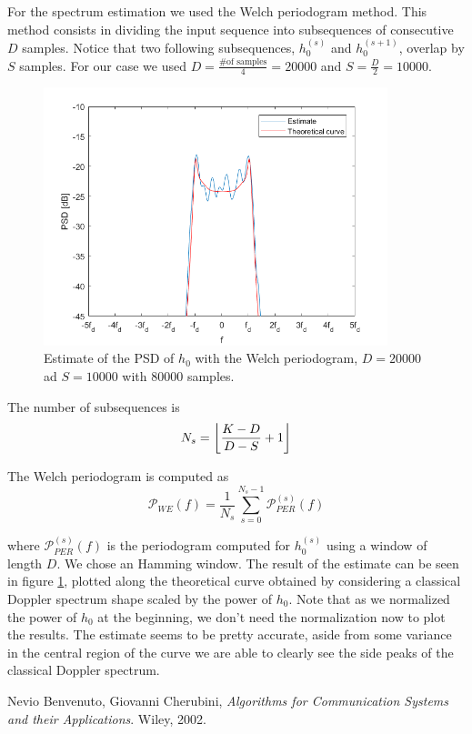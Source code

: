 \documentclass[a4paper,11.5pt]{article}
\DeclarePairedDelimiter{\floor}{\lfloor}{\rfloor}
\begin{document}
For the spectrum estimation we used the Welch periodogram method. This method consists in dividing the input sequence into subsequences of consecutive $D$ samples. Notice that two following subsequences, $h_0^{(s)}$ and $h_0^{(s+1)}$, overlap by $S$ samples. For our case we used $D =\frac{ \mbox{\# of samples}}{ 4}=20000$ and $S = \frac{D}{2}=10000$. \\


\begin{figure}[ht]
	\begin{center}    
		\includegraphics[width=10cm]{figs/PSD-est.png}
		\caption{Estimate of the PSD of $h_0$ with the Welch periodogram, $D=20000$ ad $S=10000$ with $80000$ samples.}
		\label{fig:PSD}
	\end{center}
\end{figure}
The number of subsequences is
\begin{equation}
N_s = \floor*{{\frac{K-D}{D-S}+1}}
\end{equation}

The Welch periodogram is computed as
\begin{equation}
\mathcal{P}_{WE}(f) = \frac{1}{N_s}\sum_{s=0}^{N_s-1}{\mathcal{P}}_{PER}^{(s)}(f)
\end{equation}

where ${\mathcal{P}}_{PER}^{(s)}(f)$ is the periodogram computed for $h_0^{(s)}$ using a window of length $D$. We chose an Hamming window. The result of the estimate can be seen in figure \ref{fig:PSD}, plotted along the theoretical curve obtained by considering a classical Doppler spectrum shape scaled by the power of $h_0$. Note that as we normalized the power of $h_0$ at the beginning, we don't need the normalization now to plot the results. The estimate seems to be pretty accurate, aside from some variance in the central region of the curve we are able to clearly see the side peaks of the classical Doppler spectrum.



\begin{thebibliography}{15}
	Nevio Benvenuto, Giovanni Cherubini,
	\textit{Algorithms for Communication Systems and their Applications}. 
	Wiley, 2002.
\end{thebibliography}
\end{document}
